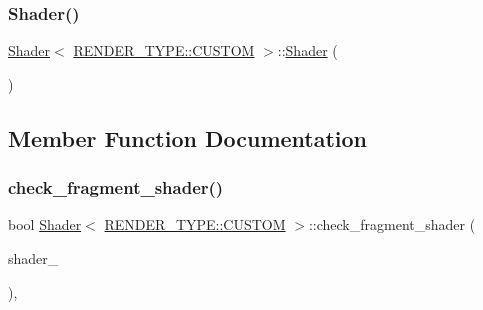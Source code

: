 \mbox{\label{classShader_3_01RENDER__TYPE_1_1CUSTOM_01_4_af1fbc8b0cb20d1af7905e2d896f0fb79}} 
\subsubsection{\texorpdfstring{Shader()}{Shader()}\hspace{0.1cm}{\footnotesize\ttfamily [3/3]}}
{\footnotesize\ttfamily \mbox{\hyperlink{classShader}{Shader}}$<$ \mbox{\hyperlink{shader__class_8hpp_a24e288e18eb7b6e01de7565001fedb60a72baef04098f035e8a320b03ad197818}{R\+E\+N\+D\+E\+R\+\_\+\+T\+Y\+P\+E\+::\+C\+U\+S\+T\+OM}} $>$\+::\mbox{\hyperlink{classShader}{Shader}} (\begin{DoxyParamCaption}\item[{const \mbox{\hyperlink{classShader}{Shader}}$<$ \mbox{\hyperlink{shader__class_8hpp_a24e288e18eb7b6e01de7565001fedb60a72baef04098f035e8a320b03ad197818}{R\+E\+N\+D\+E\+R\+\_\+\+T\+Y\+P\+E\+::\+C\+U\+S\+T\+OM}} $>$ \&}]{ }\end{DoxyParamCaption})\hspace{0.3cm}{\ttfamily [delete]}}



\subsection{Member Function Documentation}
\mbox{\label{classShader_3_01RENDER__TYPE_1_1CUSTOM_01_4_a8ba4a9ccbbf73e471434981a62b15d41}} 
\subsubsection{\texorpdfstring{check\+\_\+fragment\+\_\+shader()}{check\_fragment\_shader()}}
{\footnotesize\ttfamily bool \mbox{\hyperlink{classShader}{Shader}}$<$ \mbox{\hyperlink{shader__class_8hpp_a24e288e18eb7b6e01de7565001fedb60a72baef04098f035e8a320b03ad197818}{R\+E\+N\+D\+E\+R\+\_\+\+T\+Y\+P\+E\+::\+C\+U\+S\+T\+OM}} $>$\+::check\+\_\+fragment\+\_\+shader (\begin{DoxyParamCaption}\item[{const unsigned}]{shader\+\_\+ }\end{DoxyParamCaption})\hspace{0.3cm}{\ttfamily [inline]}, {\ttfamily [protected]}}



